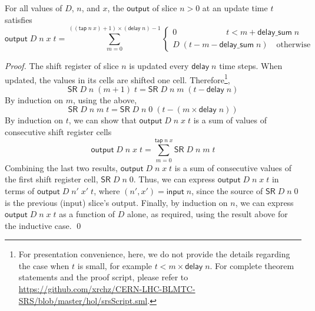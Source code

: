 \documentclass{llncs}
\begin{document}
\begin{theorem}\label{output_input_at_update_times}
For all values of $D$, $n$, and $x$, the $\mathsf{output}$ of slice $n>0$ at an update time $t$ satisfies
\begin{equation*}
\mathsf{output}\;D\;n\;x\;t=\sum_{m=0}^{((\mathsf{tap}\;n\;x)+1)\times(\mathsf{delay}\;n)-1}\begin{cases}0 \qquad\qquad\qquad  t<m+\mathsf{delay\_sum}\;n\\D\;(t-m-\mathsf{delay\_sum}\;n)\quad\text{otherwise}\end{cases}
\end{equation*}
\end{theorem}

\begin{proof}
The shift register of slice $n$ is updated every $\mathsf{delay}\;n$ time steps.
When updated, the values in its cells are shifted one cell.
Therefore\footnote{For presentation convenience, here, we do not provide the details regarding the case when $t$ is small, for example $t<m\times\mathsf{delay}\;n$.
For complete theorem statements and the proof script, please refer to \url{https://github.com/xrchz/CERN-LHC-BLMTC-SRS/blob/master/hol/srsScript.sml}.},
\begin{equation*}
\mathsf{SR}\;D\;n\;(m+1)\;t=\mathsf{SR}\;D\;n\;m\;(t-\mathsf{delay}\;n)
\end{equation*}
By induction on $m$, using the above,
\begin{equation*}
\mathsf{SR}\;D\;n\;m\;t=\mathsf{SR}\;D\;n\;0\;(t-(m\times\mathsf{delay}\;n))
\end{equation*}
By induction on $t$, we can show that $\mathsf{output}\;D\;n\;x\;t$ is a sum of values of consecutive shift register cells
\begin{equation*}
\mathsf{output}\;D\;n\;x\;t=\sum_{m=0}^{\mathsf{tap}\;n\;x}\mathsf{SR}\;D\;n\;m\;t
\end{equation*}
Combining the last two results, $\mathsf{output}\;D\;n\;x\;t$ is a sum of consecutive values of the first shift register cell, $\mathsf{SR}\;D\;n\;0$.
Thus, we can express $\mathsf{output}\;D\;n\;x\;t$ in terms of $\mathsf{output}\;D\;n'\;x'\;t$, where $(n',x')=\mathsf{input}\;n$, since the source of $\mathsf{SR}\;D\;n\;0$ is the previous (input) slice's output.
Finally, by induction on $n$, we can express $\mathsf{output}\;D\;n\;x\;t$ as a function of $D$ alone, as required, using the result above for the inductive case.
\qed
\end{proof}
\end{document}

